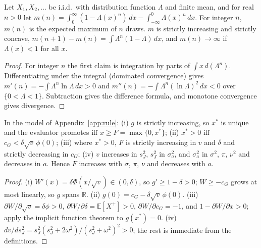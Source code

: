 \documentclass[acmsmall,screen,review,anonymous]{acmart}
\theoremstyle{acmdefinition}
\begin{document}
\begin{lemma}\label{lem:max}
Let $X_1, X_2, \ldots$ be i.i.d.\ with distribution function $\Lambda$ and finite mean, and for real $n > 0$ let $m(n) = \int_0^\infty (1 - \Lambda(x)^n)\,dx - \int_{-\infty}^0 \Lambda(x)^n\,dx$. For integer $n$, $m(n)$ is the expected maximum of $n$ draws. $m$ is strictly increasing and strictly concave, $m(n+1) - m(n) = \int \Lambda^n(1-\Lambda)\,dx$, and $m(n) \to \infty$ if $\Lambda(x) < 1$ for all $x$.
\end{lemma}
\begin{proof}
For integer $n$ the first claim is integration by parts of $\int x\,d(\Lambda^n)$. Differentiating under the integral (dominated convergence) gives $m'(n) = -\int\Lambda^n\ln\Lambda\,dx > 0$ and $m''(n) = -\int\Lambda^n(\ln\Lambda)^2\,dx < 0$ over $\{0 < \Lambda < 1\}$. Subtraction gives the difference formula, and monotone convergence gives divergence.
\end{proof}

\begin{theorem}\label{thm:rule}
In the model of Appendix~\ref{app:rule}: (i) $g$ is strictly increasing, so $x^*$ is unique and the evaluator promotes iff $x \ge F = \max\{0,x^*\}$; (ii) $x^* > 0$ iff $c_G < \delta\sqrt{v}\,\phi(0)$; (iii) where $x^* > 0$, $F$ is strictly increasing in $v$ and $\delta$ and strictly decreasing in $c_G$; (iv) $v$ increases in $s_J^2$, $s_J^2$ in $\sigma_a^2$, and $\sigma_a^2$ in $\sigma^2$, $\pi$, $\nu^2$ and decreases in $a$. Hence $F$ increases with $\sigma$, $\pi$, $\nu$ and decreases with $a$.
\end{theorem}
\begin{proof}
(i) $W'(x) = \delta\Phi(x/\sqrt{v}) \in (0,\delta)$, so $g' \ge 1 - \delta > 0$; $W \ge -c_G$ grows at most linearly, so $g$ spans $\mathbb{R}$. (ii) $g(0) = c_G - \delta\sqrt{v}\,\phi(0)$. (iii) $\partial W/\partial\sqrt{v} = \delta\phi > 0$, $\partial W/\partial\delta = \mathbb{E}[X^+] > 0$, $\partial W/\partial c_G = -1$, and $1 - \partial W/\partial x > 0$; apply the implicit function theorem to $g(x^*) = 0$. (iv) $dv/ds_J^2 = s_J^2(s_J^2 + 2\omega^2)/(s_J^2 + \omega^2)^2 > 0$; the rest is immediate from the definitions.
\end{proof}
\end{document}
